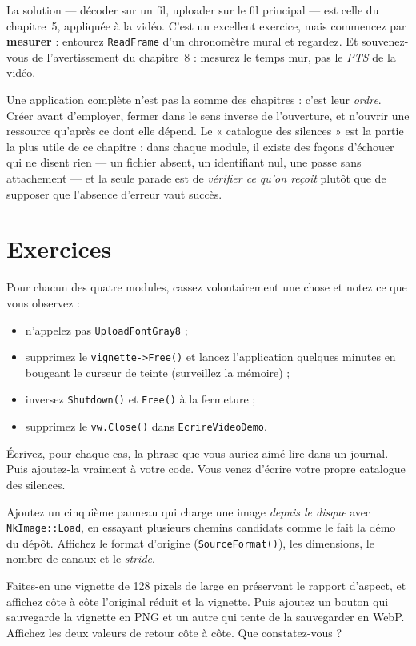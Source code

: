 La solution — décoder sur un fil, uploader sur le fil principal — est celle du
chapitre~5, appliquée à la vidéo. C'est un excellent exercice, mais commencez par
\textbf{mesurer} : entourez \texttt{ReadFrame} d'un chronomètre mural et
regardez. Et souvenez-vous de l'avertissement du chapitre~8 : mesurez le temps
mur, pas le \emph{PTS} de la vidéo.

\begin{nkbilan}
Une application complète n'est pas la somme des chapitres : c'est leur
\emph{ordre}. Créer avant d'employer, fermer dans le sens inverse de
l'ouverture, et n'ouvrir une ressource qu'après ce dont elle dépend. Le
« catalogue des silences » est la partie la plus utile de ce chapitre : dans
chaque module, il existe des façons d'échouer qui ne disent rien --- un fichier
absent, un identifiant nul, une passe sans attachement --- et la seule parade est
de \emph{vérifier ce qu'on reçoit} plutôt que de supposer que l'absence
d'erreur vaut succès.
\end{nkbilan}

\section{Exercices}

\begin{nkdemo}
Pour chacun des quatre modules, cassez volontairement une chose et notez ce que
vous observez :
\begin{itemize}
  \item n'appelez pas \texttt{UploadFontGray8} ;
  \item supprimez le \texttt{vignette->Free()} et lancez l'application quelques
        minutes en bougeant le curseur de teinte (surveillez la mémoire) ;
  \item inversez \texttt{Shutdown()} et \texttt{Free()} à la fermeture ;
  \item supprimez le \texttt{vw.Close()} dans \texttt{EcrireVideoDemo}.
\end{itemize}
Écrivez, pour chaque cas, la phrase que vous auriez aimé lire dans un journal.
Puis ajoutez-la vraiment à votre code. Vous venez d'écrire votre propre
catalogue des silences.
\end{nkdemo}

\begin{nkpratique}
Ajoutez un cinquième panneau qui charge une image \emph{depuis le disque} avec
\texttt{NkImage::Load}, en essayant plusieurs chemins candidats comme le fait la
démo du dépôt. Affichez le format d'origine (\texttt{SourceFormat()}), les
dimensions, le nombre de canaux et le \emph{stride}.

Faites-en une vignette de 128 pixels de large en préservant le rapport d'aspect,
et affichez côte à côte l'original réduit et la vignette. Puis ajoutez un bouton
qui sauvegarde la vignette en PNG et un autre qui tente de la sauvegarder en
WebP. Affichez les deux valeurs de retour côte à côte. Que constatez-vous ?
\end{nkpratique}

